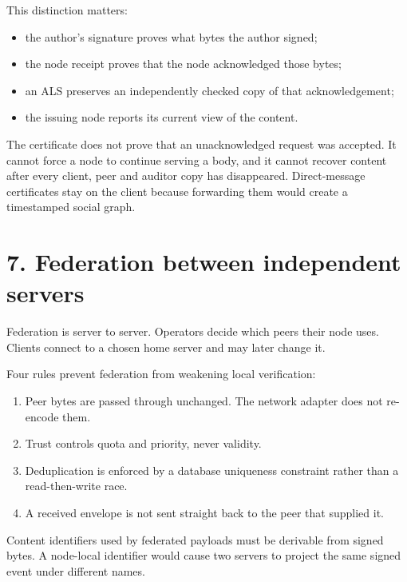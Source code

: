 \documentclass[12pt,a4paper]{article}
\begin{document}
This distinction matters:

\begin{itemize}
\item the author's signature proves what bytes the author signed;


\item the node receipt proves that the node acknowledged those bytes;


\item an ALS preserves an independently checked copy of that acknowledgement;


\item the issuing node reports its current view of the content.


\end{itemize}
The certificate does not prove that an unacknowledged request was accepted. It cannot force a node to continue serving a body, and it cannot recover content after every client, peer and auditor copy has disappeared. Direct-message certificates stay on the client because forwarding them would create a timestamped social graph.

\section*{7. Federation between independent servers}
Federation is server to server. Operators decide which peers their node uses. Clients connect to a chosen home server and may later change it.

Four rules prevent federation from weakening local verification:

\begin{enumerate}
\item Peer bytes are passed through unchanged. The network adapter does not re-encode them.


\item Trust controls quota and priority, never validity.


\item Deduplication is enforced by a database uniqueness constraint rather than a read-then-write race.


\item A received envelope is not sent straight back to the peer that supplied it.


\end{enumerate}
Content identifiers used by federated payloads must be derivable from signed bytes. A node-local identifier would cause two servers to project the same signed event under different names.
\end{document}
